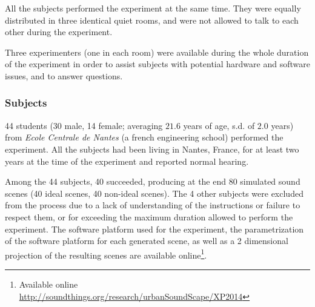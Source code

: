 \documentclass[12pt]{elsarticle}
\begin{document}

All the subjects performed the experiment at the same time. They were equally distributed in three identical quiet rooms, and were not allowed to talk to each other during the experiment.


Three experimenters (one in each room) were available during the whole duration of the experiment in order to assist subjects with potential hardware and software issues, and to answer questions.


\subsubsection*{Subjects}


44 students (30 male, 14 female; averaging $21.6$ years of age, s.d. of $2.0$ years) from \emph{Ecole Centrale de Nantes} (a french engineering school) performed the experiment. All the subjects had been living in Nantes, France, for at least two years at the time of the experiment and reported normal hearing.


Among the 44 subjects, 40 succeeded, producing at the end 80 simulated sound scenes (40 ideal scenes, 40 non-ideal scenes). The 4 other subjects were excluded from the process due to a lack of understanding of the instructions or failure to respect them, or for exceeding the maximum duration allowed to perform the experiment.  The software platform used for the experiment, the parametrization of the software platform for each generated scene, as well as a 2 dimensional projection of the resulting scenes are available online\footnote{Available online \url{http://soundthings.org/research/urbanSoundScape/XP2014}}.
\end{document}
